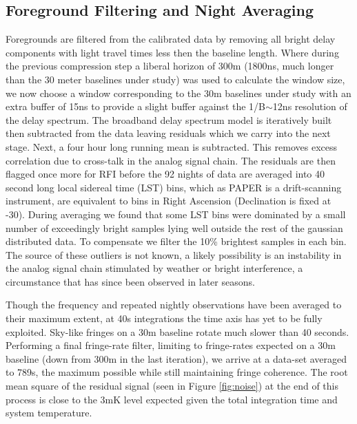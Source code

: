 \documentclass[preprint2]{aastex}
\begin{document}
\subsection{Foreground Filtering and Night Averaging}
Foregrounds are filtered from the calibrated data by removing all bright delay components with light travel times less then the baseline length. Where during the previous compression step a liberal horizon of 300m (1800ns, much longer than the 30 meter baselines under study)  was used to calculate the window size, we now choose a window corresponding to the 30m baselines under study with an extra buffer of 15ns to provide a slight buffer against the 1/B$\sim$12ns resolution of the delay spectrum.  The broadband delay spectrum model is iteratively built then subtracted from the data leaving residuals which we carry into the next stage. Next, a four hour long running mean is subtracted. This removes excess correlation due to cross-talk in the analog signal chain. The residuals are then flagged once more for RFI before the 92 nights of data are averaged into 40 second long local sidereal time (LST) bins, which as PAPER is a drift-scanning instrument, are equivalent to bins in Right Ascension (Declination is fixed at -30\arcdeg).  During averaging we found that some LST bins were dominated by a small number of exceedingly bright samples lying well outside the rest of the gaussian distributed data. To compensate we filter the 10\% brightest samples in each bin.  The source of these outliers is not known,  a likely possibility is an instability in the analog signal chain stimulated by weather or bright interference, a circumstance that has since been observed in later seasons. 


Though the frequency and repeated nightly observations have been averaged to their maximum extent, at 40s integrations the time axis has yet to be fully exploited.  Sky-like fringes on a 30m baseline rotate much slower than 40 seconds.  Performing a final fringe-rate filter, limiting to fringe-rates expected on a 30m baseline (down from 300m in the last iteration), we arrive at a data-set averaged to 789s, the maximum possible while still maintaining fringe coherence.    The root mean square of the residual signal (seen in Figure \ref{fig:noise}) at the end of this process is close to the 3mK level expected given the total integration time and  system temperature.  

\end{document}
